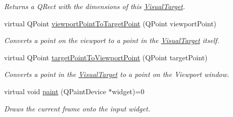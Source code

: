 \begin{DoxyCompactItemize}
\begin{DoxyCompactList}\small\item\em Returns a Q\-Rect with the dimensions of this \hyperlink{class_picto_1_1_visual_target}{Visual\-Target}. \end{DoxyCompactList}\item 
virtual Q\-Point \hyperlink{class_picto_1_1_visual_target_a8374c2da42cf1c438e043317b82b5318}{viewport\-Point\-To\-Target\-Point} (Q\-Point viewport\-Point)
\begin{DoxyCompactList}\small\item\em Converts a point on the viewport to a point in the \hyperlink{class_picto_1_1_visual_target}{Visual\-Target} itself. \end{DoxyCompactList}\item 
virtual Q\-Point \hyperlink{class_picto_1_1_visual_target_ac7e639003d6e8afa2a063447b6beb9d5}{target\-Point\-To\-Viewport\-Point} (Q\-Point target\-Point)
\begin{DoxyCompactList}\small\item\em Converts a point in the \hyperlink{class_picto_1_1_visual_target}{Visual\-Target} to a point on the Viewport window. \end{DoxyCompactList}\item 
virtual void \hyperlink{class_picto_1_1_visual_target_a8f5ca80122c7f624772336c5af0bc618}{paint} (Q\-Paint\-Device $\ast$widget)=0
\begin{DoxyCompactList}\small\item\em Draws the current frame onto the input widget. \end{DoxyCompactList}\end{DoxyCompactItemize}
